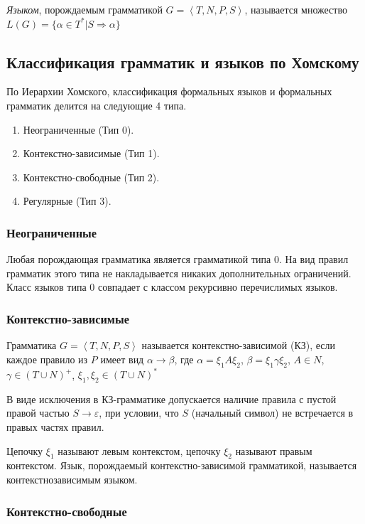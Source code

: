 \textit{Языком}, порождаемым грамматикой $G = \left\langle {T, N, P, S} \right\rangle$, 
называется множество $L(G) = \{ \alpha \in T^{*} | S \Rightarrow \alpha \}$ 

\subsection{Классификация грамматик и языков по Хомскому}

По Иерархии Хомского, классификация формальных языков 
и формальных грамматик делится на следующие 4 типа.

\begin{enumerate}
   \item Неограниченные (Тип 0).
   \item Контекстно-зависимые (Тип 1).
   \item Контекстно-свободные (Тип 2).
   \item Регулярные (Тип 3). 
\end{enumerate}

\subsubsection{Неограниченные}

Любая порождающая грамматика является грамматикой типа 0. 
На вид правил грамматик этого типа не накладывается никаких дополнительных ограничений. 
Класс языков типа 0 совпадает с классом рекурсивно перечислимых языков. 

\subsubsection{Контекстно-зависимые}

Грамматика $G = \left\langle {T, N, P, S} \right\rangle$ называется контекстно-зависимой (КЗ),
если каждое правило из $P$ имеет вид $\alpha \rightarrow \beta$, где $\alpha = \xi_1A\xi_2$, 
$\beta = \xi_1 \gamma \xi_2$, $A \in N$, $\gamma \in (T \cup N)^{+}$, $\xi_1, \xi_2 \in (T \cup N)^{*}$

В виде исключения в КЗ-грамматике допускается наличие правила с пустой правой частью
$S → \varepsilon$, при условии, что $S$ (начальный символ) не встречается в правых частях правил.

Цепочку $\xi_1$ называют левым контекстом, цепочку $\xi_2$ называют правым контекстом. 
Язык, порождаемый контекстно-зависимой грамматикой, называется контекстнозависимым языком.

\subsubsection{Контекстно-свободные}


